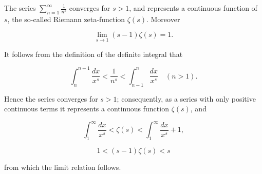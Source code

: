 The series $\sum_{n=1}^{\infty} \frac{1}{n^s}$ converges for $s > 1$, and represents a continuous function of $s$, the so-called Riemann zeta-function $\zeta(s)$. Moreover

$$\lim_{s \to 1} (s - 1)\zeta(s) = 1.$$

It follows from the definition of the definite integral that

$$\int_{n}^{n+1} \frac{dx}{x^s} < \frac{1}{n^s} < \int_{n-1}^{n} \frac{dx}{x^s} \quad (n > 1).$$

Hence the series converges for $s > 1$; consequently, as a series with only positive continuous terms it represents a continuous function $\zeta(s)$, and

$$\int_{1}^{\infty} \frac{dx}{x^s} < \zeta(s) < \int_{1}^{\infty} \frac{dx}{x^s} + 1,$$

$$1 < (s - 1)\zeta(s) < s$$

from which the limit relation follows.
